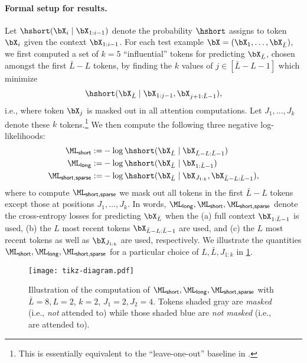 \paragraph{Formal setup for results.} Let $\hshort(\bX_i \mid \bX_{1:i-1})$ denote the probability $\hshort$ assigns to token $\bX_i$ given the context $\bX_{1:i-1}$. For each test example $\bX = (\bX_1, \ldots, \bX_{\bar L})$, we first computed a set of $k=5$ ``influential'' tokens for predicting $\bX_{\bar L}$, chosen amongst the first $\bar L - L$ tokens, by finding the $k$ values of $j \in [\bar L - L-1]$ which minimize
\begin{align}
\hshort(\bX_{\bar L} \mid \bX_{1:j-1}, \bX_{j+1:\bar L - 1})\label{eq:choose-j},
\end{align}
i.e., where token $\bX_j$ is masked out in all attention computations. Let $J_1, \ldots, J_k$ denote these $k$ tokens.\footnote{This is essentially equivalent to the ``leave-one-out'' baseline in \citet{cohen_contextcite_2024}.}
We then compute the following three negative log-likelihoods:
\begin{align}
  \ML_{\mathsf{short}} :=& -\log \hshort(\bX_{\bar L} \mid \bX_{\bar L - L:\bar L - 1})\nonumber\\
  \ML_{\mathsf{long}} :=& -\log \hshort(\bX_{\bar L} \mid \bX_{1:\bar L - 1})\nonumber\\
  \ML_{\mathsf{short,sparse}} :=& -\log \hshort(\bX_{\bar L} \mid \bX_{J_{1:k}}, \bX_{\bar L - L: \bar L - 1})\nonumber,
\end{align}
where to compute $\ML_{\mathsf{short,sparse}}$ we mask out all tokens in the first $\bar L - L$ tokens except those at positions $J_1, \ldots, J_k$. In words, $\ML_{\mathsf{long}}, \ML_{\mathsf{short}}, \ML_{\mathsf{short,sparse}}$ denote the cross-entropy losses for predicting $\bX_{\bar L}$ when the (a) full context $\bX_{1:\bar L-1}$ is used, (b) the $L$ most recent tokens $\bX_{\bar L - L: \bar L - 1}$ are used, and (c) the $L$ most recent tokens as well as $\bX_{J_{1:k}}$ are used, respectively. We illustrate the quantities $\ML_{\mathsf{short}}, \ML_{\mathsf{long}}, \ML_{\mathsf{short,sparse}}$ for a particular choice of $L, \bar L, J_{1:k}$ in \cref{fig:lshortlong}.

\begin{figure}
  \centering
  \texttt{[image: tikz-diagram.pdf]}
  \caption{Illustration of the computation of $\ML_{\mathsf{short}}, \ML_{\mathsf{long}}, \ML_{\mathsf{short,sparse}}$ with $\bar L = 8, L = 2$, $k = 2$, $J_1 = 2, J_2 = 4$. Tokens shaded gray are \emph{masked} (i.e., \emph{not} attended to) while those shaded blue are \emph{not masked} (i.e., are attended to).}
  \label{fig:lshortlong}
\end{figure}

